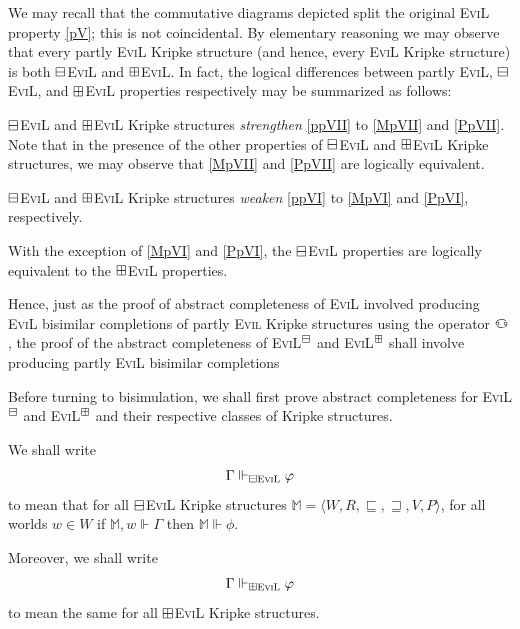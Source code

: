 We may recall that the commutative diagrams depicted split
the original \textsc{EviL} property \ref{pV};  this is not coincidental.
By elementary reasoning we may observe that every 
partly \textsc{EviL} Kripke structure 
(and hence, every \textsc{EviL} Kripke structure) is  
both $\boxminus$\textsc{EviL} and $\boxplus$\textsc{EviL}.  In fact, the logical differences between partly
\textsc{EviL}, $\boxminus$\textsc{EviL}, and $\boxplus$\textsc{EviL} properties respectively may be summarized as follows:
\begin{bul}
\item $\boxminus$\textsc{EviL} and $\boxplus$\textsc{EviL} Kripke structures \emph{strengthen} \ref{ppVII} to
\ref{MpVII} and \ref{PpVII}.  Note that in the presence of the other properties
of $\boxminus$\textsc{EviL} and $\boxplus$\textsc{EviL} Kripke structures,
we may observe that \ref{MpVII} and \ref{PpVII} are logically equivalent.
\item $\boxminus$\textsc{EviL} and $\boxplus$\textsc{EviL} Kripke structures \emph{weaken} \ref{ppVI} to
\ref{MpVI} and \ref{PpVI}, respectively.
\item With the exception of \ref{MpVI} and
\ref{PpVI}, the $\boxminus$\textsc{EviL} properties are logically
equivalent to the $\boxplus$\textsc{EviL} properties.
\end{bul}

Hence, just as the proof of abstract completeness of \textsc{EviL}
involved producing \textsc{EviL} bisimilar completions of partly
\textsc{Evil} 
Kripke structures using the operator $\invis$, 
the proof of the abstract completeness of
\textsc{EviL}$^\boxminus$ and \textsc{EviL}$^\boxplus$ shall involve producing
partly \textsc{EviL} bisimilar completions

Before turning to bisimulation, we shall first prove abstract
completeness for \textsc{EviL}$^\boxminus$ and \textsc{EviL}$^\boxplus$ and their
respective classes of Kripke structures.

\begin{definition}\label{BM-BPEviL-Vdash}
We shall write
\[ \Gamma \Vdash_{\boxminus\textup{\textsc{EviL}}} \varphi \]
to mean that for all $\boxminus$\textsc{EviL}  Kripke structures
$\mathbb{M} = \langle W, R, \sqsubseteq, \sqsupseteq, V, P \rangle$,
for all worlds $w \in W$ if $\mathbb{M},w \Vdash \Gamma$ then
$\mathbb{M} \Vdash \phi$.

Moreover, we shall write
\[ \Gamma \Vdash_{\boxplus\textup{\textsc{EviL}}} \varphi \]
to mean the same for all $\boxplus$\textsc{EviL}  Kripke structures.
\end{definition}

